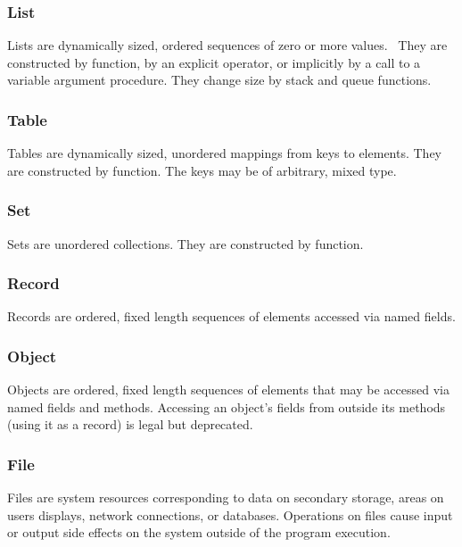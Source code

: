 \subsubsection{List}

Lists are dynamically sized, ordered sequences of zero or
more values. \ They are constructed by function, by an explicit
operator, or implicitly by a call to a variable argument procedure.
They change size by stack and queue
functions.

\subsubsection{Table}

Tables are dynamically sized, unordered mappings from keys
to elements. They are constructed by function. The keys may be of
arbitrary, mixed type.

\subsubsection{Set}

Sets are unordered collections. They are constructed by
function.

\subsubsection{Record}

Records are ordered, fixed length sequences of elements
accessed via named fields.

\subsubsection{Object}

Objects are ordered, fixed length sequences of elements
that may be accessed via named fields and methods. Accessing an object's
fields from outside its methods (using it as a record) is legal but
deprecated.

\subsubsection[File]{File}

Files are system resources corresponding to data on
secondary storage, areas on users{\textquotesingle} displays, network
connections, or databases. Operations on files
cause input or output side effects on the system outside
of the program execution.

